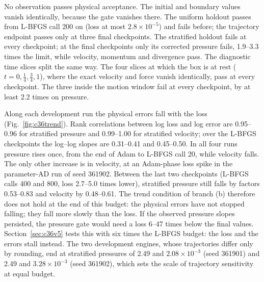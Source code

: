 \documentclass[11pt]{article}
\begin{document}
No observation passes physical acceptance. The initial and boundary values
vanish identically, because the gate vanishes there. The uniform holdout
passes from L-BFGS call 200 on (loss at most $2.8\times10^{-5}$) and fails
before; the trajectory endpoint passes only at three final checkpoints. The
stratified holdout fails at every checkpoint; at the final checkpoints only
its corrected pressure fails, 1.9--3.3 times the limit, while velocity,
momentum and divergence pass. The diagnostic time slices split the same way.
The four slices at which the box is at rest ($t=0,\tfrac14,\tfrac34,1$), where
the exact velocity and force vanish identically, pass at every checkpoint.
The three inside the motion window fail at every
checkpoint, by at least 2.2 times on pressure.

Along each development run the physical errors fall with the loss
(Fig.~\ref{fig:c36trend}). Rank correlations between log loss and log error
are 0.95--0.96 for stratified pressure and 0.99--1.00 for stratified
velocity; over the L-BFGS checkpoints the log--log slopes are 0.31--0.41 and
0.45--0.50. In all four runs pressure rises once, from the end of Adam to
L-BFGS call 20, while velocity falls. The only other increase is in velocity,
at an Adam-phase loss spike in the parameter-AD run of seed 361902. Between the last two checkpoints
(L-BFGS calls 400 and 800, loss 2.7--5.0 times lower), stratified pressure
still falls by factors 0.53--0.83 and velocity by 0.48--0.61. The trend
condition of branch (b) therefore does not hold at the end of this budget:
the physical errors have not stopped falling; they fall more slowly than the
loss. If the observed pressure slopes persisted, the pressure gate would need
a loss 6--47 times below the final values. Section~\ref{sec:c36v5} tests
this with six times the L-BFGS budget: the loss and the errors stall
instead.
The two development engines, whose trajectories differ only by rounding, end
at stratified pressures of 2.49 and $2.08\times10^{-3}$ (seed 361901) and
2.49 and $3.28\times10^{-3}$ (seed 361902), which sets the scale of
trajectory sensitivity at equal budget.
\end{document}
